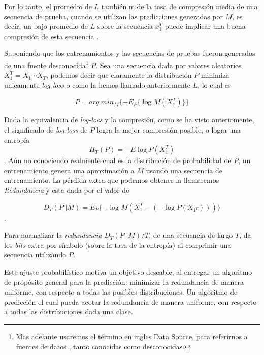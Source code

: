 Por lo tanto, el promedio de $L$ también mide la tasa de compresión media de una secuencia de prueba, cuando se utilizan las predicciones generadas por $M$, es decir, un bajo promedio de $L$ %
sobre la secuencia $x_{1}^{T}$ puede implicar una buena compresión de esta secuencia \cite{Begleiter2004}.

Suponiendo que los entrenamientos y las secuencias de pruebas fueron generados de una fuente desconocida\footnote{Mas adelante usaremos el término en ingles Data Source, para referirnos a fuentes de datos , tanto conocidas como desconocidas.} $P$. Sea una secuencia dada por valores aleatorios $X_{1}^{T} = X_{1} \cdots X_{T} $, podemos decir que claramente la distribución $P$ minimiza unicamente \emph{log-loss} o como la hemos llamado anteriormente $L$, lo cual es

\begin{equation}
P = arg\ min_{M} \{ - E_{P} \{\log M( X_{1}^{T} )\}   \}
\end{equation}


Dada la equivalencia de \emph{log-loss} y la compresión, como se ha visto anteriomente, el significado de \emph{log-loss} de $P$ logra la mejor compresión posible, o logra una entropía 
\begin{equation}
	H_{T}(P) = - E \log P( X_{1}^{T} )
\end{equation}. Aún no conociendo realmente cual es la distribución de probabilidad de $P$, un entrenamiento genera una aproximación a $M$ usando una secuencia de entrenamiento. La pérdida extra que podemos obtener la llamaremos \emph{Redundancia} y esta dada por el valor de

\begin{equation}
D_{T} ( P || M ) = E_{P} \{ - \log M(X_{1}^{T} - (- \log P(X_{1^{T}})   )  )       \} 
\end{equation}.
 

Para normalizar la \emph{redundancia} $D_{T} ( P || M ) / T $, de una secuencia de largo $T$, da los  \emph{bits} extra por símbolo (sobre la tasa de la entropía) al comprimir una secuencia utilizando $P$.  

Este ajuste probabilístico motiva un objetivo deseable, al entregar un algoritmo de propósito general para la predicción: minimizar la redundancia de manera uniforme, con respecto a todas las posibles distribuciones. Un algoritmo de predicción el cual pueda acotar la redundancia de manera uniforme, con respecto a todas las distribuciones dada una clase.

